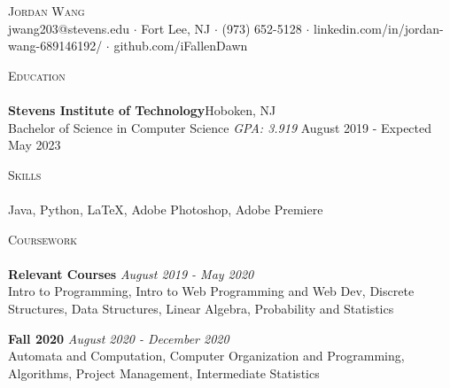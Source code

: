 \documentclass[10pt]{article}
\newcommand{\lineunder} {
    \vspace*{-8pt} \\
    \hspace*{-18pt} \hrulefill \\
}
\newcommand{\header} [1] {
    {\hspace*{-18pt}\vspace*{6pt} \textsc{#1}}
    \vspace*{-6pt} \lineunder
}
\begin{document}
\vspace*{-40pt}

    

\vspace*{2pt}
\begin{center}
	{\Huge \scshape {Jordan Wang}}\\
	jwang203@stevens.edu $\cdot$ Fort Lee, NJ $\cdot$ (973) 652-5128 $\cdot$ linkedin.com/in/jordan-wang-689146192/ $\cdot$ github.com/iFallenDawn \\
\end{center}

\header{Education}
\textbf{Stevens Institute of Technology}\hfill Hoboken, NJ\\
Bachelor of Science in Computer Science \textit{GPA: 3.919} \hfill August 2019 - Expected May 2023\\
\vspace{2mm}

\header{Skills}
	Java, Python, \LaTeX, Adobe Photoshop, Adobe Premiere                    \\
\vspace{2mm}

\header{Coursework}
{\textbf{Relevant Courses}} {\sl August 2019 - May 2020} \hfill 
\\
Intro to Programming, Intro to Web Programming and Web Dev, Discrete Structures, Data Structures, Linear Algebra, Probability and Statistics\\
\vspace*{2mm}

{\textbf{Fall 2020}} {\sl August 2020 - December 2020} \hfill 
\\
Automata and Computation, Computer Organization and Programming, Algorithms, Project Management, Intermediate Statistics\\
\vspace*{2mm}
\ 
\end{document}
